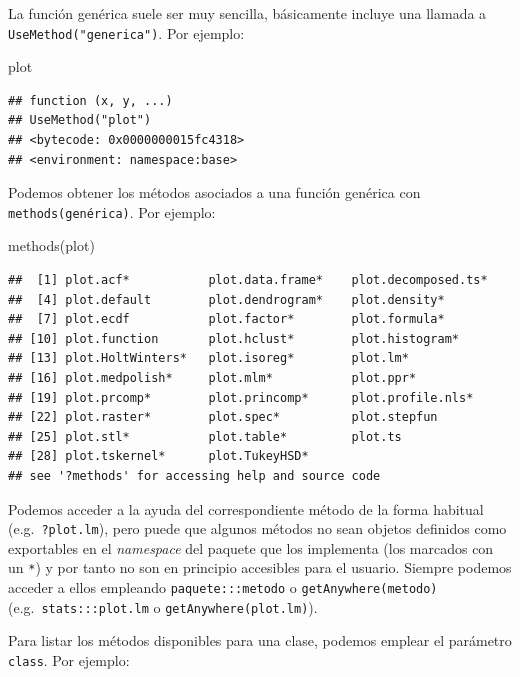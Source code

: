 \documentclass[
]{book}
\newenvironment{Shaded}{\begin{snugshade}}{\end{snugshade}}
\newcommand{\FunctionTok}[1]{\textcolor[rgb]{0.00,0.00,0.00}{#1}}
\newcommand{\NormalTok}[1]{#1}
\theoremstyle{break}
\theoremstyle{nonumberplain}
\begin{document}
La función genérica suele ser muy sencilla, básicamente incluye una llamada a \texttt{UseMethod("generica")}.
Por ejemplo:

\begin{Shaded}
\begin{Highlighting}[]
\NormalTok{plot}
\end{Highlighting}
\end{Shaded}

\begin{verbatim}
## function (x, y, ...) 
## UseMethod("plot")
## <bytecode: 0x0000000015fc4318>
## <environment: namespace:base>
\end{verbatim}

Podemos obtener los métodos asociados a una función genérica con \texttt{methods(genérica)}.
Por ejemplo:

\begin{Shaded}
\begin{Highlighting}[]
\FunctionTok{methods}\NormalTok{(plot)}
\end{Highlighting}
\end{Shaded}

\begin{verbatim}
##  [1] plot.acf*           plot.data.frame*    plot.decomposed.ts*
##  [4] plot.default        plot.dendrogram*    plot.density*      
##  [7] plot.ecdf           plot.factor*        plot.formula*      
## [10] plot.function       plot.hclust*        plot.histogram*    
## [13] plot.HoltWinters*   plot.isoreg*        plot.lm*           
## [16] plot.medpolish*     plot.mlm*           plot.ppr*          
## [19] plot.prcomp*        plot.princomp*      plot.profile.nls*  
## [22] plot.raster*        plot.spec*          plot.stepfun       
## [25] plot.stl*           plot.table*         plot.ts            
## [28] plot.tskernel*      plot.TukeyHSD*     
## see '?methods' for accessing help and source code
\end{verbatim}

Podemos acceder a la ayuda del correspondiente método de la forma habitual (e.g.~\texttt{?plot.lm}), pero puede que algunos métodos no sean objetos definidos como exportables en el \emph{namespace} del paquete que los implementa (los marcados con un \texttt{*}) y por tanto no son en principio accesibles para el usuario.
Siempre podemos acceder a ellos empleando \texttt{paquete:::metodo} o \texttt{getAnywhere(metodo)} (e.g.~\texttt{stats:::plot.lm} o \texttt{getAnywhere(plot.lm)}).

Para listar los métodos disponibles para una clase, podemos emplear el parámetro \texttt{class}.
Por ejemplo:
\end{document}
